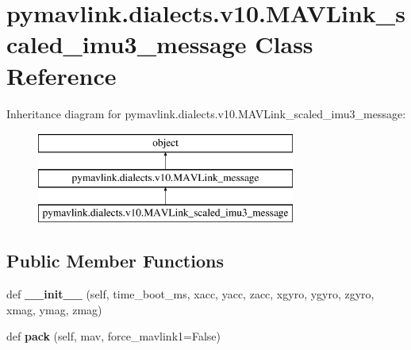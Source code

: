 \hypertarget{classpymavlink_1_1dialects_1_1v10_1_1MAVLink__scaled__imu3__message}{}\section{pymavlink.\+dialects.\+v10.\+M\+A\+V\+Link\+\_\+scaled\+\_\+imu3\+\_\+message Class Reference}
\label{classpymavlink_1_1dialects_1_1v10_1_1MAVLink__scaled__imu3__message}
Inheritance diagram for pymavlink.\+dialects.\+v10.\+M\+A\+V\+Link\+\_\+scaled\+\_\+imu3\+\_\+message\+:\begin{figure}[H]
\begin{center}
\leavevmode
\includegraphics[height=3.000000cm]{classpymavlink_1_1dialects_1_1v10_1_1MAVLink__scaled__imu3__message}
\end{center}
\end{figure}
\subsection*{Public Member Functions}
\begin{DoxyCompactItemize}
\item 
\mbox{\label{classpymavlink_1_1dialects_1_1v10_1_1MAVLink__scaled__imu3__message_abc7e4fef91b3d89a02bc643b09e995c6}} 
def {\bfseries \+\_\+\+\_\+init\+\_\+\+\_\+} (self, time\+\_\+boot\+\_\+ms, xacc, yacc, zacc, xgyro, ygyro, zgyro, xmag, ymag, zmag)
\item 
\mbox{\label{classpymavlink_1_1dialects_1_1v10_1_1MAVLink__scaled__imu3__message_a18557fe9f51440bf073f832363a3a28e}} 
def {\bfseries pack} (self, mav, force\+\_\+mavlink1=False)
\end{DoxyCompactItemize}
